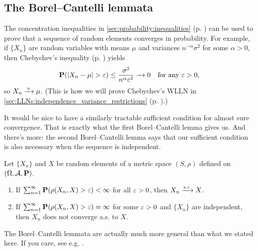 \documentclass[11pt,letterpaper,reqno,oneside]{article}
\begin{document}
\subsection{The Borel--Cantelli lemmata}
\label{sec:modes_of_convergence:Borel--Cantelli}

The concentration inequalities in \cref{sec:probability:inequalities} (p. \pageref{sec:probability:inequalities}) can be used to prove that a sequence of random elements converges in probability. For example, if $\{ X_n \}$ are random variables with means $\mu$ and variances $n^{-\alpha} \sigma^2$ for some $\alpha>0$, then Chebychev's inequality (p. \pageref{corollary:Chebychevs_inequality}) yields
%
\begin{equation*}
	\PP( \abs*{X_n-\mu} > \eps ) \leq \frac{ \sigma^2 }{ n^\alpha \eps^2 } \conv 0
	\quad\text{for any $\eps>0$} ,
\end{equation*}
%
so $X_n \convp \mu$. (This is how we will prove Chebychev's WLLN in \cref{sec:LLNs:independence_variance_restrictions} (p. \pageref{sec:LLNs:independence_variance_restrictions}).)

It would be nice to have a similarly tractable sufficient condition for almost sure convergence. That is exactly what the first Borel--Cantelli lemma gives us. And there's more: the second Borel--Cantelli lemma says that our sufficient condition is also necessary when the sequence is independent.
%
\begin{theorem}
	Let $\{ X_n \}$ and $X$ be random elements of a metric space $(S,\rho)$ defined on $(\Omega,\mathcal{A},\PP)$.
	\begin{enumerate}

		\item If $\sum_{n=1}^\infty \PP( \rho(X_n,X) > \eps ) < \infty$ for all $\eps>0$, then $X_n \convas X$.

		\item If $\sum_{n=1}^\infty \PP( \rho(X_n,X) > \eps ) = \infty$ for some $\eps>0$ and $\{ X_n \}$ are independent, then $X_n$ does not converge a.s. to $X$.

	\end{enumerate}
\end{theorem}

The Borel--Cantelli lemmata are actually much more general than what we stated here. If you care, see e.g. \textcite[][Theorem 3.4.2]{Rosenthal2006}.
\end{document}
